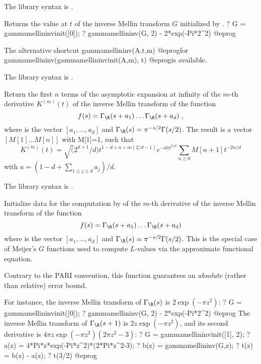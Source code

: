 The library syntax is .

\label{se:gammamellininv}
Returns the value at $t$ of the inverse Mellin transform
$G$ initialized by .
\bprog
? G = gammamellininvinit([0]);
? gammamellininv(G, 2) - 2*exp(-Pi*2^2)
@eprog

The alternative shortcut
\bprog
  gammamellininv(A,t,m)
@eprog\noindent for
\bprog
  gammamellininv(gammamellininvinit(A,m), t)
@eprog\noindent is available.

The library syntax is .

\label{se:gammamellininvasymp}
Return the first $n$ terms of the asymptotic expansion at infinity
of the $m$-th derivative $K^{(m)}(t)$ of the inverse Mellin transform of the
function
$$f(s) = \Gamma_\R(s+a_1)\*\ldots\*\Gamma_\R(s+a_d)\;,$$
where  is the vector $[a_1,\ldots,a_d]$ and
$\Gamma_\R(s)=\pi^{-s/2}\*\Gamma(s/2)$.
The result is a vector
$[M[1]...M[n]]$ with M[1]=1, such that
$$K^{(m)}(t)=\sqrt(2^{d+1}/d)t^{1-d+a+m(2/d-1)}e^{-d\pi t^{2/d}}
   \sum_{n\ge0} M[n+1]t^{-2n/d}$$
with $a=(1-d+\sum_{1\le j\le d}a_j)/d$.

The library syntax is .

\label{se:gammamellininvinit}
Initialize data for the computation by  of
the $m$-th derivative of the inverse Mellin transform of the function
$$f(s) = \Gamma_\R(s+a_1)\*\ldots\*\Gamma_\R(s+a_d)$$
where  is the vector $[a_1,\ldots,a_d]$ and
$\Gamma_\R(s)=\pi^{-s/2}\*\Gamma(s/2)$. This is the special case of Meijer's
$G$ functions used to compute $L$-values via the approximate functional
equation.

 Contrary to the PARI convention, this function
guarantees an \emph{absolute} (rather than relative) error bound.

For instance, the inverse Mellin transform of $\Gamma_\R(s)$ is
$2\exp(-\pi z^2)$:
\bprog
? G = gammamellininvinit([0]);
? gammamellininv(G, 2) - 2*exp(-Pi*2^2)
@eprog
The inverse Mellin transform of $\Gamma_\R(s+1)$ is
$2 z\exp(-\pi z^2)$, and its second derivative is
$ 4\pi z \exp(-\pi z^2)(2\pi z^2 - 3)$:
\bprog
? G = gammamellininvinit([1], 2);
? a(z) = 4*Pi*z*exp(-Pi*z^2)*(2*Pi*z^2-3);
? b(z) = gammamellininv(G,z);
? t(z) = b(z) - a(z);
? t(3/2)
@eprog

